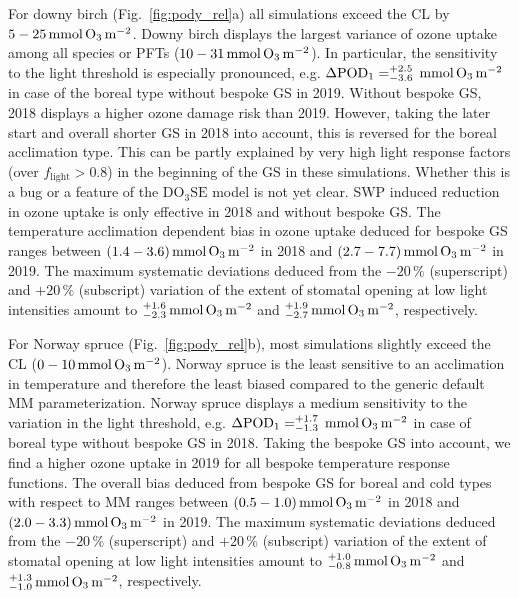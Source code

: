 \documentclass[bg, manuscript]{copernicus}
\begin{document}
For downy birch (Fig.~\ref{fig:pody_rel}a) all simulations exceed the CL by $5-25\,\unit{mmol\,\chem{O_3}\,m^{-2}}$. Downy birch displays the largest variance of ozone uptake among all species or PFTs ($10-31\,\unit{mmol\,\chem{O_3}\,m^{-2}}$). In particular, the sensitivity to the light threshold is especially pronounced, e.g. $\Delta\mathrm{POD_1} = ^{+2.5}_{-3.6}\,\unit{mmol\,\chem{O_3}\,m^{-2}}$ in case of the boreal type without bespoke GS in 2019. Without bespoke GS, 2018 displays a higher ozone damage risk than 2019. However, taking the later start and overall shorter GS in 2018 into account, this is reversed for the boreal acclimation type. This can be partly explained by very high light response factors (over $f_\mathrm{light}>0.8$) in the beginning of the GS in these simulations. Whether this is a bug or a feature of the $\mathrm{DO_3SE}$ model is not yet clear. SWP induced reduction in ozone uptake is only effective in 2018 and without bespoke GS. The temperature acclimation dependent bias in ozone uptake deduced for bespoke GS ranges between $(1.4-3.6)\,\unit{mmol\,\chem{O_3}\,m^{-2}}$ in 2018 and $(2.7-7.7)\,\unit{mmol\,\chem{O_3}\,m^{-2}}$ in 2019. The maximum systematic deviations deduced from the $-20\,\unit{\%}$ (superscript) and $+20\,\unit{\%}$ (subscript) variation of the extent of stomatal opening at low light intensities amount to $^{+1.6}_{-2.3}\,\unit{mmol\,\chem{O_3}\,m^{-2}}$ and $^{+1.9}_{-2.7}\,\unit{mmol\,\chem{O_3}\,m^{-2}}$, respectively. 

For Norway spruce (Fig.~\ref{fig:pody_rel}b), most simulations slightly exceed the CL ($0-10\,\unit{mmol\,\chem{O_3}\,m^{-2}}$). Norway spruce is the least sensitive to an acclimation in temperature and therefore the least biased compared to the generic default MM parameterization. Norway spruce displays a medium sensitivity to the variation in the light threshold, e.g. $\Delta\mathrm{POD_1} = ^{+1.7}_{-1.3}\,\unit{mmol\,\chem{O_3}\,m^{-2}}$ in case of boreal type without bespoke GS in 2018. Taking the bespoke GS into account, we find a higher ozone uptake in 2019 for all bespoke temperature response functions. The overall bias deduced from bespoke GS for boreal and cold types with respect to MM ranges between $(0.5-1.0)\,\unit{mmol\,\chem{O_3}\,m^{-2}}$ in 2018 and $(2.0-3.3)\,\unit{mmol\,\chem{O_3}\,m^{-2}}$ in 2019. The maximum systematic deviations deduced from the $-20\,\unit{\%}$ (superscript) and $+20\,\unit{\%}$ (subscript) variation of the extent of stomatal opening at low light intensities amount to $^{+1.0}_{-0.8}\,\unit{mmol\,\chem{O_3}\,m^{-2}}$ and $^{+1.3}_{-1.0}\,\unit{mmol\,\chem{O_3}\,m^{-2}}$, respectively.
\end{document}
